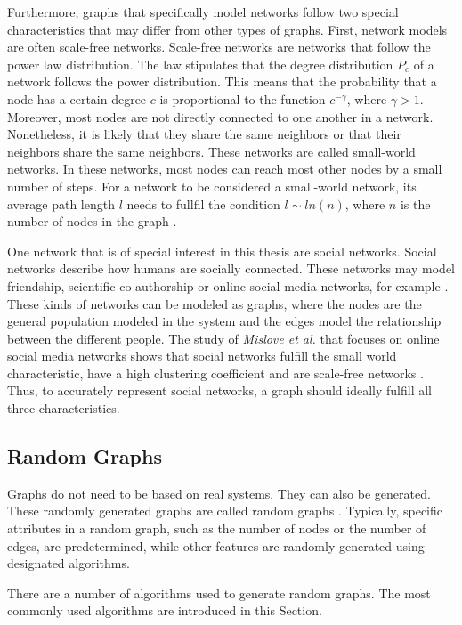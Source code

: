 Furthermore, graphs that specifically model networks follow two special 
characteristics that may differ from other types of graphs.
First, network models are often scale-free networks.
Scale-free networks are networks that follow the power law distribution.
The law stipulates that the degree distribution $P_c$ of a network
follows the power distribution.
This means that the probability that a node has a certain degree $c$ 
is proportional to the function $c^{-\gamma}$, where
$\gamma>1$.
Moreover, most nodes are not directly connected to one another in a network.
Nonetheless, it is likely that they share the same neighbors or that their
neighbors share the same neighbors. These networks are called small-world 
networks. In these networks, most nodes can reach most other
nodes by a small number of steps. For a network
to be considered a small-world network, its average path length $l$ 
needs to fullfil the condition $l\sim ln(n)$, where $n$ is the number
of nodes in the graph \cite{wattsmodel}.

One network that is of special interest in this thesis are social networks.
Social networks describe how humans are socially connected. 
These networks may model friendship, scientific co-authorship 
or online social media networks, for example \cite{basicnetwork}. 
These kinds of networks can be modeled as graphs, where the nodes 
are the general population modeled in the system
and the edges model the relationship between the 
different people.
The study of \textit{Mislove et al.} that focuses on online social media networks
shows that social networks fulfill the small world characteristic,
have a high clustering coefficient and are scale-free networks
\cite{mislovesocialnetworkcharacteristics}. Thus, to accurately represent 
social networks, a graph should ideally fulfill all three characteristics.

\subsection{Random Graphs}
\label{randomgraphssection}
Graphs do not need to be based on real systems. They can also be generated. 
These randomly generated graphs are called random graphs \cite{randomgraphs}.
Typically, specific attributes in a random graph, such as the number of nodes 
or the number of edges, are predetermined, 
while other features are randomly generated using designated algorithms.

There are a number of algorithms used to generate random graphs.
The most commonly used algorithms are introduced in this Section.


